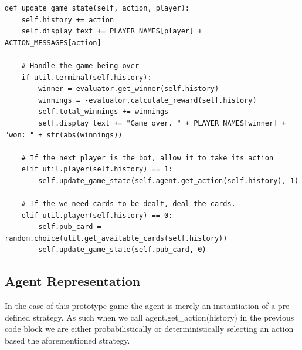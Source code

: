 \begin{lstlisting}[style=Python]
def update_game_state(self, action, player):
    self.history += action
    self.display_text += PLAYER_NAMES[player] + ACTION_MESSAGES[action]

    # Handle the game being over
    if util.terminal(self.history):
        winner = evaluator.get_winner(self.history)
        winnings = -evaluator.calculate_reward(self.history)
        self.total_winnings += winnings
        self.display_text += "Game over. " + PLAYER_NAMES[winner] + "won: " + str(abs(winnings))

    # If the next player is the bot, allow it to take its action
    elif util.player(self.history) == 1:
        self.update_game_state(self.agent.get_action(self.history), 1)

    # If the we need cards to be dealt, deal the cards.
    elif util.player(self.history) == 0:
        self.pub_card = random.choice(util.get_available_cards(self.history))
        self.update_game_state(self.pub_card, 0)
\end{lstlisting}

\subsection{Agent Representation}\label{subsec:agent}
In the case of this prototype game the agent is merely an instantiation of a pre-defined strategy.
As such when we call agent.get\_action(history) in the previous code block we are either probabilistically
or deterministically selecting an action based the aforementioned strategy.

